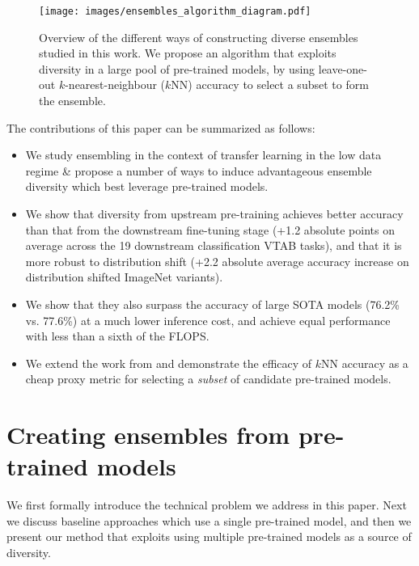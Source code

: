 \documentclass{article} \usepackage{iclr2021_conference,times}
\begin{document}
\begin{figure}
    \centering
    \vspace{-1ex}
    \texttt{[image: images/ensembles\_algorithm\_diagram.pdf]}
\caption{Overview of the different ways of constructing diverse ensembles studied in this work. We propose an algorithm that
     exploits diversity in a large pool of pre-trained models, by using leave-one-out $k$-nearest-neighbour ($k$NN) accuracy to select a subset to form the ensemble.}
\label{fig:algorithm}
\end{figure}

The contributions of this paper can be summarized as follows:
\begin{itemize}[leftmargin=*] \item We study ensembling in the context of transfer learning in the low data regime \& propose a number of ways to induce advantageous ensemble diversity which best leverage pre-trained models.
     \item We show that diversity from upstream pre-training achieves better accuracy than that from the downstream fine-tuning stage (+1.2 absolute points on average across the 19 downstream classification VTAB tasks), and that it is more robust to distribution shift (+2.2 absolute average accuracy increase on distribution shifted ImageNet variants).
     \item We show that they also surpass the accuracy of large SOTA models (76.2\% vs. 77.6\%) at a much lower inference cost, and achieve equal performance with less than a sixth of the FLOPS.\item We extend the work from \citet{puigcerver2020experts} and demonstrate the efficacy of $k$NN accuracy as a cheap proxy metric for selecting a \emph{subset} of candidate pre-trained models.
\end{itemize}

 


\section{Creating ensembles from pre-trained models}
We first formally introduce the technical problem we address in this paper.
Next we discuss baseline approaches which use a single pre-trained model, and then we present our method that exploits using multiple pre-trained models as a source of diversity.
\end{document}
